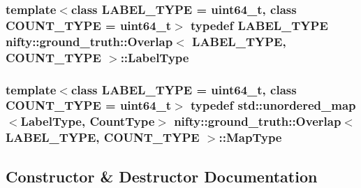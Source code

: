 \subsubsection[{Label\+Type}]{\setlength{\rightskip}{0pt plus 5cm}template$<$class L\+A\+B\+E\+L\+\_\+\+T\+Y\+P\+E  = uint64\+\_\+t, class C\+O\+U\+N\+T\+\_\+\+T\+Y\+P\+E  = uint64\+\_\+t$>$ typedef L\+A\+B\+E\+L\+\_\+\+T\+Y\+P\+E {\bf nifty\+::ground\+\_\+truth\+::\+Overlap}$<$ L\+A\+B\+E\+L\+\_\+\+T\+Y\+P\+E, C\+O\+U\+N\+T\+\_\+\+T\+Y\+P\+E $>$\+::{\bf Label\+Type}}\label{classnifty_1_1ground__truth_1_1Overlap_af14b9a872d3736d3115231866bc71612}
\hypertarget{classnifty_1_1ground__truth_1_1Overlap_a6866ee8c988dd21d3fbd6ee5c2e836bf}{}
\subsubsection[{Map\+Type}]{\setlength{\rightskip}{0pt plus 5cm}template$<$class L\+A\+B\+E\+L\+\_\+\+T\+Y\+P\+E  = uint64\+\_\+t, class C\+O\+U\+N\+T\+\_\+\+T\+Y\+P\+E  = uint64\+\_\+t$>$ typedef std\+::unordered\+\_\+map$<${\bf Label\+Type}, {\bf Count\+Type}$>$ {\bf nifty\+::ground\+\_\+truth\+::\+Overlap}$<$ L\+A\+B\+E\+L\+\_\+\+T\+Y\+P\+E, C\+O\+U\+N\+T\+\_\+\+T\+Y\+P\+E $>$\+::{\bf Map\+Type}}\label{classnifty_1_1ground__truth_1_1Overlap_a6866ee8c988dd21d3fbd6ee5c2e836bf}


\subsection{Constructor \& Destructor Documentation}
\hypertarget{classnifty_1_1ground__truth_1_1Overlap_aedaa9af95b736f17f2dbfe0eff4c09bf}{}
